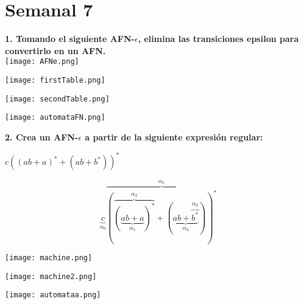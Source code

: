 \renewcommand{\labelenumi}{\alph{enumi})}
\section*{Semanal 7}
\textbf{1. Tomando el siguiente AFN-$\epsilon$, elimina las transiciones epsilon para convertirlo en un AFN.}
\\ 
\texttt{[image: AFNe.png]}

\begin{center}
    \texttt{[image: firstTable.png]}

\texttt{[image: secondTable.png]}

\texttt{[image: automataFN.png]}
\end{center}

\textbf{2. Crea un AFN-$\epsilon$ a partir de la siguiente expresi\'on regular:}

\begin{center}
    $c((ab + a)^{*} + (ab + b^{*}))^{*}$

    \begin{equation}
        \underbrace{c}_{\alpha_{0}}\overbrace{(\overbrace{(\underbrace{ab + a}_{\alpha_{1}})^{*}}^{\alpha_{2}} + (\underbrace{ab + \overbrace{b^{*}}^{\alpha_{3}}}_{\alpha_{4}}))^{*}}^{\alpha_{5}}
    \end{equation}

    \texttt{[image: machine.png]}

    \texttt{[image: machine2.png]}

    \texttt{[image: automataa.png]}

\end{center}


